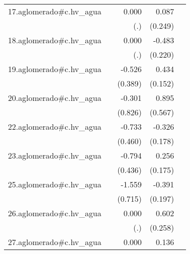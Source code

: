 {\begin{longtable}{l*{4}{D{.}{.}{-1}}}
\addlinespace
17.aglomerado#c.hv\_agua&                     &       0.000         &       0.087         &                     \\
            &                     &         (.)         &     (0.249)         &                     \\
\addlinespace
18.aglomerado#c.hv\_agua&                     &       0.000         &      -0.483\sym{*}  &                     \\
            &                     &         (.)         &     (0.220)         &                     \\
\addlinespace
19.aglomerado#c.hv\_agua&                     &      -0.526         &       0.434\sym{**} &                     \\
            &                     &     (0.389)         &     (0.152)         &                     \\
\addlinespace
20.aglomerado#c.hv\_agua&                     &      -0.301         &       0.895         &                     \\
            &                     &     (0.826)         &     (0.567)         &                     \\
\addlinespace
22.aglomerado#c.hv\_agua&                     &      -0.733         &      -0.326         &                     \\
            &                     &     (0.460)         &     (0.178)         &                     \\
\addlinespace
23.aglomerado#c.hv\_agua&                     &      -0.794         &       0.256         &                     \\
            &                     &     (0.436)         &     (0.175)         &                     \\
\addlinespace
25.aglomerado#c.hv\_agua&                     &      -1.559\sym{*}  &      -0.391\sym{*}  &                     \\
            &                     &     (0.715)         &     (0.197)         &                     \\
\addlinespace
26.aglomerado#c.hv\_agua&                     &       0.000         &       0.602\sym{*}  &                     \\
            &                     &         (.)         &     (0.258)         &                     \\
\addlinespace
27.aglomerado#c.hv\_agua&                     &       0.000         &       0.136         &                     \\

\end{longtable}}
